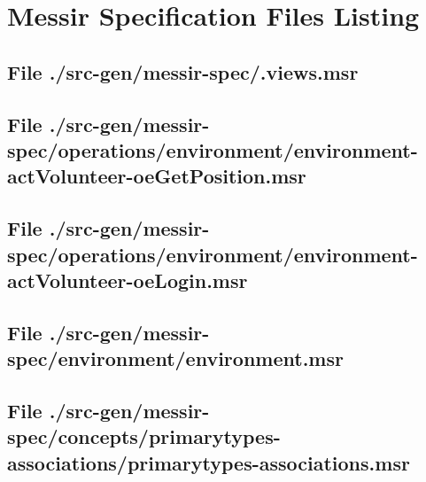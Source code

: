 \chapter{Messir Specification Files Listing}

\section[File /src-gen/messir-spec/.views.msr]{File ./src-gen/messir-spec/.views.msr}
\scriptsize

\normalsize
	
\section[File /src-gen/messir-spec.../environment-actVolunteer-oeGetPosition.msr]{File ./src-gen/messir-spec/operations/environment/environment-actVolunteer-oeGetPosition.msr}
\scriptsize

\normalsize
	
\section[File /src-gen/messir-spec/operations.../environment-actVolunteer-oeLogin.msr]{File ./src-gen/messir-spec/operations/environment/environment-actVolunteer-oeLogin.msr}
\scriptsize

\normalsize
	
\section[File /src-gen/messir-spec/environment/environment.msr]{File ./src-gen/messir-spec/environment/environment.msr}
\scriptsize

\normalsize
	
\section[File /src-gen/messir-spec/concepts.../primarytypes-associations.msr]{File ./src-gen/messir-spec/concepts/primarytypes-associations/primarytypes-associations.msr}
\scriptsize

\normalsize
	
